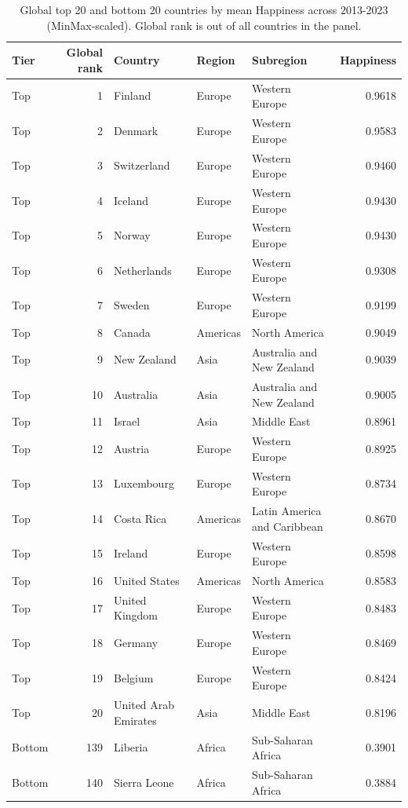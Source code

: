\begin{table}
\caption{Global top 20 and bottom 20 countries by mean Happiness across 2013-2023 (MinMax-scaled). Global rank is out of all countries in the panel.}
\label{tab:top-bottom-global}
\begin{tabular}{lrlllr}
\toprule
Tier & Global rank & Country & Region & Subregion & Happiness \\
\midrule
Top & 1 & Finland & Europe & Western Europe & 0.9618 \\
Top & 2 & Denmark & Europe & Western Europe & 0.9583 \\
Top & 3 & Switzerland & Europe & Western Europe & 0.9460 \\
Top & 4 & Iceland & Europe & Western Europe & 0.9430 \\
Top & 5 & Norway & Europe & Western Europe & 0.9430 \\
Top & 6 & Netherlands & Europe & Western Europe & 0.9308 \\
Top & 7 & Sweden & Europe & Western Europe & 0.9199 \\
Top & 8 & Canada & Americas & North America & 0.9049 \\
Top & 9 & New Zealand & Asia & Australia and New Zealand & 0.9039 \\
Top & 10 & Australia & Asia & Australia and New Zealand & 0.9005 \\
Top & 11 & Israel & Asia & Middle East & 0.8961 \\
Top & 12 & Austria & Europe & Western Europe & 0.8925 \\
Top & 13 & Luxembourg & Europe & Western Europe & 0.8734 \\
Top & 14 & Costa Rica & Americas & Latin America and Caribbean & 0.8670 \\
Top & 15 & Ireland & Europe & Western Europe & 0.8598 \\
Top & 16 & United States & Americas & North America & 0.8583 \\
Top & 17 & United Kingdom & Europe & Western Europe & 0.8483 \\
Top & 18 & Germany & Europe & Western Europe & 0.8469 \\
Top & 19 & Belgium & Europe & Western Europe & 0.8424 \\
Top & 20 & United Arab Emirates & Asia & Middle East & 0.8196 \\
Bottom & 139 & Liberia & Africa & Sub-Saharan Africa & 0.3901 \\
Bottom & 140 & Sierra Leone & Africa & Sub-Saharan Africa & 0.3884 \\

\end{tabular}
\end{table}
